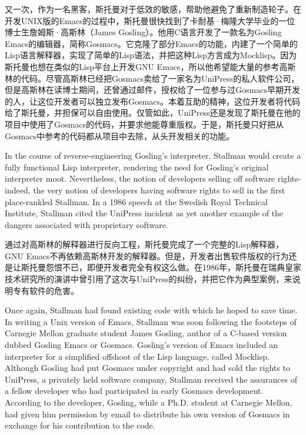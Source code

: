 \ifdefined\chs
又一次，作为一名黑客，斯托曼对于低效的敏感，帮助他避免了重新制造轮子。在开发UNIX版的Emacs的过程中，斯托曼很快找到了卡耐基·梅隆大学毕业的一位博士生詹姆斯·高斯林（James Gosling）。他用C语言开发了一款名为Gosling Emacs的编辑器，简称Gosmacs。它克隆了部分Emacs的功能，内建了一个简单的Lisp语言解释器，实现了简单的Lisp语法，并把这种Lisp方言成为Mocklisp。因为斯托曼也想在类似的Lisp平台上开发GNU Emacs，所以他希望能大量的参考高斯林的代码。尽管高斯林已经把Gosmacs卖给了一家名为UniPress的私人软件公司，但是高斯林在读博士期间，还曾通过邮件，授权给了一位参与过Gosmacs早期开发的人，让这位开发者可以独立发布Gosmacs。本着互助的精神，这位开发者将代码给了斯托曼，并担保可以自由使用。仅管如此，UniPress还是发现了斯托曼在他的项目中使用了Gosmacs的代码，并要求他能尊重版权。于是，斯托曼只好把从Gosmacs中参考的代码都从项目中去除，从头开发相关的功能。

\fi

\ifdefined\eng
In the course of reverse-engineering Gosling's interpreter, Stallman would create a fully functional Lisp interpreter, rendering the need for Gosling's original interpreter moot. Nevertheless, the notion of developers selling off software rights-indeed, the very notion of developers having software rights to sell in the first place-rankled Stallman. In a 1986 speech at the Swedish Royal Technical Institute, Stallman cited the UniPress incident as yet another example of the dangers associated with proprietary software.
\fi

\ifdefined\chs
通过对高斯林的解释器进行反向工程，斯托曼完成了一个完整的Lisp解释器，GNU Emacs不再依赖高斯林开发的解释器。但是，开发者出售软件版权的行为还是让斯托曼怨恨不已，即便开发者完全有权这么做。在1986年，斯托曼在瑞典皇家技术研究所的演讲中曾引用了这次与UniPress的纠纷，并把它作为典型案例，来说明专有软件的危害。
\fi

\fi
\ifdefined\vtwo
\ifdefined\eng
Once again, Stallman had found existing code with which he hoped to save time. In writing a Unix version of Emacs, Stallman was soon following the footsteps of Carnegie Mellon graduate student James Gosling, author of a C-based version dubbed Gosling Emacs or Gosmacs. Gosling's version of Emacs included an interpreter for a simplified offshoot of the Lisp language, called Mocklisp. Although Gosling had put Gosmacs under copyright and had sold the rights to UniPress, a privately held software company, Stallman received the assurances of a fellow developer who had participated in early Gosmacs development. According to the developer, Gosling, while a Ph.D. student at Carnegie Mellon, had given him permission by email to distribute his own version of Gosmacs in exchange for his contribution to the code.
\fi

